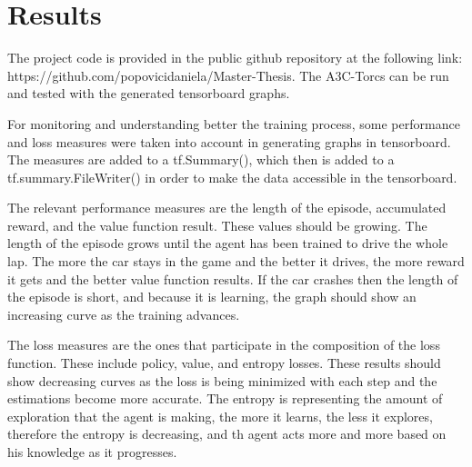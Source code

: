 \chapter{Results}
The project code is provided in the public github repository at the following link: https://github.com/popovicidaniela/Master-Thesis.
The A3C-Torcs can be run and tested with the generated tensorboard graphs.

For monitoring and understanding better the training process, some performance and loss measures were taken into account in generating graphs in tensorboard. The measures are added to a tf.Summary(), which then is added to a tf.summary.FileWriter() in order to make the data accessible in the tensorboard.

The relevant performance measures are the length of the episode, accumulated reward, and the value function result. These values should be growing. The length of the episode grows until the agent has been trained to drive the whole lap. The more the car stays in the game and the better it drives, the more reward it gets and the better value function results. If the car crashes then the length of the episode is short, and because it is learning, the graph should show an increasing curve as the training advances. 

The loss measures are the ones that participate in the composition of the loss function. These include policy, value, and entropy losses. These results should show decreasing curves as the loss is being minimized with each step and the estimations become more accurate. The entropy is representing the amount of exploration that the agent is making, the more it learns, the less it explores, therefore the entropy is decreasing, and th agent acts more and more based on his knowledge as it progresses.

